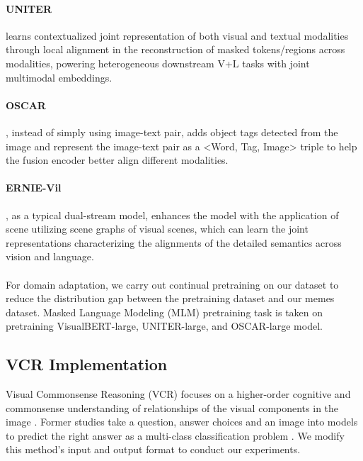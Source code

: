 \documentclass[11pt]{article}
\begin{document}
\paragraph{UNITER} \citep{chen2020uniter} learns contextualized joint representation of both visual and textual modalities through local alignment in the reconstruction of masked tokens/regions across modalities, powering heterogeneous downstream V+L tasks with joint multimodal embeddings.

\paragraph{OSCAR}\citep{li2020oscar}, instead of simply using image-text pair, adds object tags detected from the image and represent the image-text pair as a <Word, Tag, Image> triple to help the fusion encoder better align different modalities.

\paragraph{ERNIE-Vil} \citep{yu2020ernie}, as a typical dual-stream model, enhances the model with the application of scene utilizing scene graphs of visual scenes, which can learn the joint representations characterizing the alignments of the detailed semantics across vision and language. 

\paragraph{} For domain adaptation, we carry out continual pretraining on our dataset to reduce the distribution gap between the pretraining dataset and our memes dataset. Masked Language Modeling (MLM) pretraining task is taken on pretraining VisualBERT-large, UNITER-large, and OSCAR-large model.




\subsection{VCR Implementation}

Visual Commonsense Reasoning (VCR) focuses on a higher-order cognitive and commonsense understanding of relationships of the visual components in the image \citep{zellers2019recognition}. Former studies take a question, answer choices and an image into models to predict the right answer as a multi-class classification problem \citep{su2019vl}. We modify this method's input and output format to conduct our experiments. 
\end{document}
